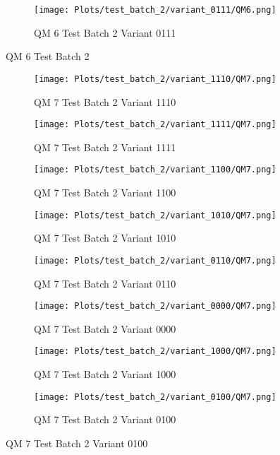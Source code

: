 \documentclass{DissertateFigs}
\begin{document}
\begin{figure}[t!]
\medskip

    \begin{subfigure}{0.47\textwidth}
    \texttt{[image: Plots/test\_batch\_2/variant\_0111/QM6.png]}
    \caption{QM 6 Test Batch 2 Variant 0111}
    \end{subfigure}
\caption{QM 6 Test Batch 2}
    \end{figure}
\clearpage
\begin{figure}[t!]
    \begin{subfigure}{0.47\textwidth}
    \texttt{[image: Plots/test\_batch\_2/variant\_1110/QM7.png]}
    \caption{QM 7 Test Batch 2 Variant 1110}
    \end{subfigure}
    \begin{subfigure}{0.47\textwidth}
    \texttt{[image: Plots/test\_batch\_2/variant\_1111/QM7.png]}
    \caption{QM 7 Test Batch 2 Variant 1111}
    \end{subfigure}

\medskip

    \begin{subfigure}{0.47\textwidth}
    \texttt{[image: Plots/test\_batch\_2/variant\_1100/QM7.png]}
    \caption{QM 7 Test Batch 2 Variant 1100}
    \end{subfigure}
    \begin{subfigure}{0.47\textwidth}
    \texttt{[image: Plots/test\_batch\_2/variant\_1010/QM7.png]}
    \caption{QM 7 Test Batch 2 Variant 1010}
    \end{subfigure}

\medskip

    \begin{subfigure}{0.47\textwidth}
    \texttt{[image: Plots/test\_batch\_2/variant\_0110/QM7.png]}
    \caption{QM 7 Test Batch 2 Variant 0110}
    \end{subfigure}
    \begin{subfigure}{0.47\textwidth}
    \texttt{[image: Plots/test\_batch\_2/variant\_0000/QM7.png]}
    \caption{QM 7 Test Batch 2 Variant 0000}
    \end{subfigure}

\medskip

    \begin{subfigure}{0.47\textwidth}
    \texttt{[image: Plots/test\_batch\_2/variant\_1000/QM7.png]}
    \caption{QM 7 Test Batch 2 Variant 1000}
    \end{subfigure}
    \begin{subfigure}{0.47\textwidth}
    \texttt{[image: Plots/test\_batch\_2/variant\_0100/QM7.png]}
    \caption{QM 7 Test Batch 2 Variant 0100}
    \end{subfigure}


\end{figure}
\end{document}
